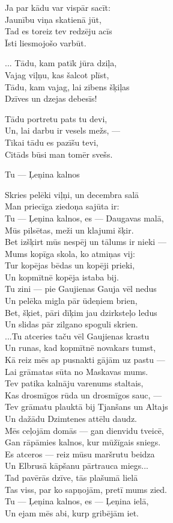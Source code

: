 \documentclass[14pt]{extarticle}
\begin{document}
{{Ja par kādu var vispār sacīt:\\
Jaunību viņa skatienā jūt,\\
Tad es toreiz tev redzēju acīs\\
Īsti liesmojošo varbūt. 

... Tādu, kam patīk jūra dziļa,\\
Vajag viļņu, kas šalcot plīst,\\
Tādu, kam vajag, lai zibens šķiļas\\
Dzīves un dzejas debesīs!

Tādu portretu pats tu devi,\\
Un, lai darbu ir vesels mežs, ---\\
Tikai tādu es pazīšu tevi,\\
Citāds būsi man tomēr svešs. 


\newpage

{\large \sc Tu --- Ļeņina kalnos}

Skries pelēki viļņi, un decembra salā\\
Man priecīga ziedoņa sajūta ir:\\
Tu --- Ļeņina kalnos, es --- Daugavas malā,\\
Mūs pilsētas, meži un klajumi šķir.\\
Bet izšķirt mūs nespēj un tālums ir nieki ---\\
Mums kopīga skola, ko atmiņas vij:\\
Tur kopējas bēdas un kopēji prieki,\\
Un kopmītnē kopēja istaba bij.\\
Tu zini --- pie Gaujienas Gauja vēl nedus\\
Un pelēka migla pār ūdeņiem brien,\\
Bet, šķiet, pāri dīķim jau dzirksteļo ledus\\
Un slidas pār zilgano spoguli skrien.\\
...Tu atceries taču vēl Gaujienas krastu\\
Un runas, kad kopmītnē novakars tumst,\\
Kā reiz mēs ap pusnakti gājām uz pastu ---\\
Lai grāmatas sūta no Maskavas mums.\\
Tev patika kalnāju varenums staltais,\\
Kas drosmīgos rūda un drosmīgos sauc, ---\\
Tev grāmatu plauktā bij Tjanšans un Altajs\\
Un dažādu Dzimtenes attēlu daudz.\\
Mēs ceļojām domās --- gan dienvidu tveicē,\\
Gan rāpāmies kalnos, kur mūžīgais sniegs.\\
Es atceros --- reiz mūsu maršrutu beidza\\
Un Elbrusā kāpšanu pārtrauca miegs...\\
\mbox{}\hspace{10pt} Tad pavērās dzīve, tās plašumā lielā\\
Tas viss, par ko sapņojām, pretī mums zied.\\
Tu --- Ļeņina kalnos, es --- Ļeņina ielā,\\
Un ejam mēs abi, kurp gribējām iet.


}}
\end{document}
